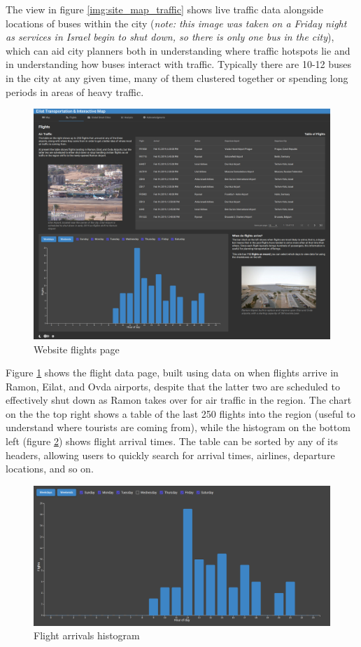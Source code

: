 \documentclass[12pt]{article}                       %
\begin{document}
The view in figure \ref{img:site_map_traffic} shows live traffic data alongside locations of buses within the city (\textit{note: this image was taken on a Friday night as services in Israel begin to shut down, so there is only one bus in the city}), which can aid city planners both in understanding where traffic hotspots lie and in understanding how buses interact with traffic. Typically there are 10-12 buses in the city at any given time, many of them clustered together or spending long periods in areas of heavy traffic.

\newpage
\begin{figure}[H]
    \centering
    \includegraphics[width=12cm]{images/site_flights.png}
    \caption{Website flights page}
    \label{img:site_flights}
\end{figure}

Figure \ref{img:site_flights} shows the flight data page, built using data on when flights arrive in Ramon, Eilat, and Ovda airports, despite that the latter two are scheduled to effectively shut down as Ramon takes over for air traffic in the region. The chart on the the top right shows a table of the last 250 flights into the region (useful to understand where tourists are coming from), while the histogram on the bottom left (figure \ref{img:site_flights_histograpm}) shows flight arrival times. The table can be sorted by any of its headers, allowing users to quickly search for arrival times, airlines, departure locations, and so on.

\newpage
\begin{figure}[H]
    \centering
    \includegraphics[width=13cm]{images/site_flights_graph.png}
    \caption{Flight arrivals histogram}
    \label{img:site_flights_histograpm}
\end{figure}
\end{document}

